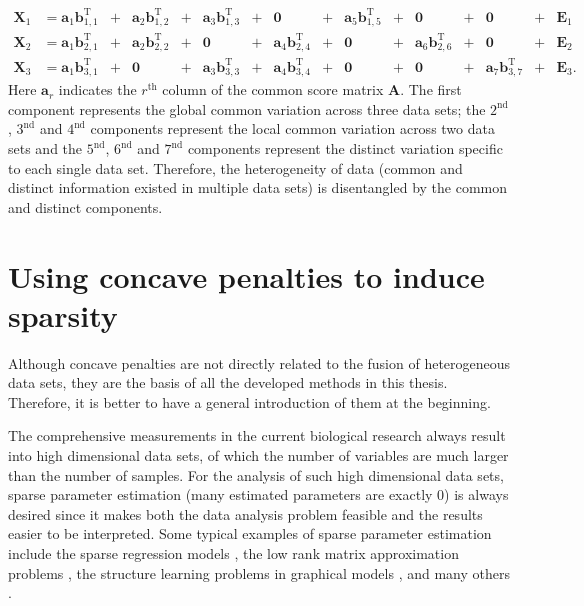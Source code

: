 \begin{equation*}
\begin{aligned}
   \mathbf{X}_1 & = \mathbf{a}_1\mathbf{b}_{1,1}^{\text{T}} &+& \mathbf{a}_2\mathbf{b}_{1,2}^{\text{T}} &+& \mathbf{a}_3\mathbf{b}_{1,3}^{\text{T}} &+& \mathbf{0}                     &+& \mathbf{a}_5\mathbf{b}_{1,5}^{\text{T}} &+& \mathbf{0}                     &+& \mathbf{0}  &+& \mathbf{E}_1                   \\
   \mathbf{X}_2 & = \mathbf{a}_1\mathbf{b}_{2,1}^{\text{T}} &+& \mathbf{a}_2\mathbf{b}_{2,2}^{\text{T}} &+& \mathbf{0}                     &+& \mathbf{a}_4\mathbf{b}_{2,4}^{\text{T}} &+& \mathbf{0}                     &+& \mathbf{a}_6\mathbf{b}_{2,6}^{\text{T}} &+& \mathbf{0}  &+& \mathbf{E}_2                   \\
   \mathbf{X}_3 & = \mathbf{a}_1\mathbf{b}_{3,1}^{\text{T}} &+& \mathbf{0}                     &+& \mathbf{a}_3\mathbf{b}_{3,3}^{\text{T}} &+& \mathbf{a}_4\mathbf{b}_{3,4}^{\text{T}} &+& \mathbf{0}                     &+& \mathbf{0}                     &+& \mathbf{a}_7\mathbf{b}_{3,7}^{\text{T}} &+& \mathbf{E}_3 .
\end{aligned}
\end{equation*}
Here $\mathbf{a}_r$ indicates the $r^{\text{th}}$ column of the common score matrix $\mathbf{A}$. The first component represents the global common variation across three data sets; the $2^{\text{nd}}$, $3^{\text{nd}}$ and $4^{\text{nd}}$ components represent the local common variation across two data sets and the $5^{\text{nd}}$, $6^{\text{nd}}$ and $7^{\text{nd}}$ components represent the distinct variation specific to each single data set. Therefore, the heterogeneity of data (common and distinct information existed in multiple data sets) is disentangled by the common and distinct components.

\section{Using concave penalties to induce sparsity}
Although concave penalties are not directly related to the fusion of heterogeneous data sets, they are the basis of all the developed methods in this thesis. Therefore, it is better to have a general introduction of them at the beginning.

The comprehensive measurements in the current biological research always result into high dimensional data sets, of which the number of variables are much larger than the number of samples. For the analysis of such high dimensional data sets, sparse parameter estimation (many estimated parameters are exactly 0) is always desired since it makes both the data analysis problem feasible and the results easier to be interpreted. Some typical examples of sparse parameter estimation include the sparse regression models \cite{fan2001variable}, the low rank matrix approximation problems \cite{jolliffe2002principal, smilde2017common, gavish2017optimal}, the structure learning problems in graphical models \cite{friedman2008sparse}, and many others \cite{tibshirani2005sparsity, witten2009penalized,huang2012selective}.

